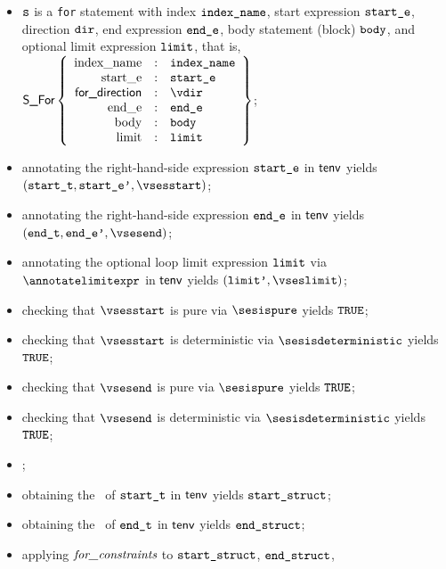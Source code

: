 \begin{itemize}
  \item $\texttt{s}$ is a \texttt{for} statement with index $\texttt{index\_name}$,
        start expression $\texttt{start\_e}$,
        direction $\texttt{dir}$,
        end expression $\texttt{end\_e}$,
        body statement (block) $\texttt{body}$,
        and optional limit expression $\texttt{limit}$,
        that is, $\SFor\left\{\begin{array}{rcl}
          \Forindexname &:& \vindexname\\
          \Forstarte &:& \vstarte\\
          \fordirection &:& \vdir\\
          \Forende &:& \vende\\
          \Forbody &:& \vbody\\
          \Forlimit &:& \vlimit
        \end{array}\right\}$;
  \item annotating the right-hand-side expression $\texttt{start\_e}$ in $\textsf{tenv}$ yields \\
        $(\vstartt, \vstartep, \vsesstart)$\ProseOrTypeError;
  \item annotating the right-hand-side expression $\texttt{end\_e}$ in $\textsf{tenv}$ yields \\ $(\vendt, \vendep, \vsesend)$\ProseOrTypeError;
  \item annotating the optional loop limit expression $\texttt{limit}$ via $\annotatelimitexpr$ in $\textsf{tenv}$
        yields $(\vlimitp, \vseslimit)$\ProseOrTypeError;
  \item checking that $\vsesstart$ is pure via $\sesispure$ yields $\texttt{TRUE}$\ProseOrTypeError;
  \item checking that $\vsesstart$ is deterministic via $\sesisdeterministic$ yields $\texttt{TRUE}$\ProseOrTypeError;
  \item checking that $\vsesend$ is pure via $\sesispure$ yields $\texttt{TRUE}$\ProseOrTypeError;
  \item checking that $\vsesend$ is deterministic via $\sesisdeterministic$ yields $\texttt{TRUE}$\ProseOrTypeError;
  \item {};
  \item obtaining the \underlyingtype\ of $\texttt{start\_t}$ in $\textsf{tenv}$ yields $\texttt{start\_struct}$\ProseOrTypeError;
  \item obtaining the \underlyingtype\ of $\texttt{end\_t}$ in $\textsf{tenv}$ yields $\texttt{end\_struct}$\ProseOrTypeError;
  \item applying $\textit{for\_constraints}$ to $\texttt{start\_struct}$, $\texttt{end\_struct}$,

\end{itemize}
